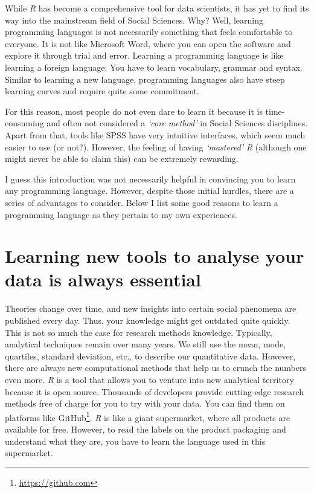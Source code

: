 \documentclass[
  letterpaper,
]{krantz}
\renewcommand{\href}[2]{#2\footnote{\url{#1}}}
\begin{document}
While \emph{R} has become a comprehensive tool for data scientists, it
has yet to find its way into the mainstream field of Social Sciences.
Why? Well, learning programming languages is not necessarily something
that feels comfortable to everyone. It is not like Microsoft Word, where
you can open the software and explore it through trial and error.
Learning a programming language is like learning a foreign language: You
have to learn vocabulary, grammar and syntax. Similar to learning a new
language, programming languages also have steep learning curves and
require quite some commitment.

For this reason, most people do not even dare to learn it because it is
time-consuming and often not considered a \emph{`core method'} in Social
Sciences disciplines. Apart from that, tools like SPSS have very
intuitive interfaces, which seem much easier to use (or not?). However,
the feeling of having \emph{`mastered'} \emph{R} (although one might
never be able to claim this) can be extremely rewarding.

I guess this introduction was not necessarily helpful in convincing you
to learn any programming language. However, despite those initial
hurdles, there are a series of advantages to consider. Below I list some
good reasons to learn a programming language as they pertain to my own
experiences.

\section{Learning new tools to analyse your data is always
essential}\label{sec-learning-new-tools-to-analyse-your-data-is-always-essential}

Theories change over time, and new insights into certain social
phenomena are published every day. Thus, your knowledge might get
outdated quite quickly. This is not so much the case for research
methods knowledge. Typically, analytical techniques remain over many
years. We still use the mean, mode, quartiles, standard deviation, etc.,
to describe our quantitative data. However, there are always new
computational methods that help us to crunch the numbers even more.
\emph{R} is a tool that allows you to venture into new analytical
territory because it is open source. Thousands of developers provide
cutting-edge research methods free of charge for you to try with your
data. You can find them on platforms like
\href{https://github.com}{GitHub}. \emph{R} is like a giant supermarket,
where all products are available for free. However, to read the labels
on the product packaging and understand what they are, you have to learn
the language used in this supermarket.
\end{document}
